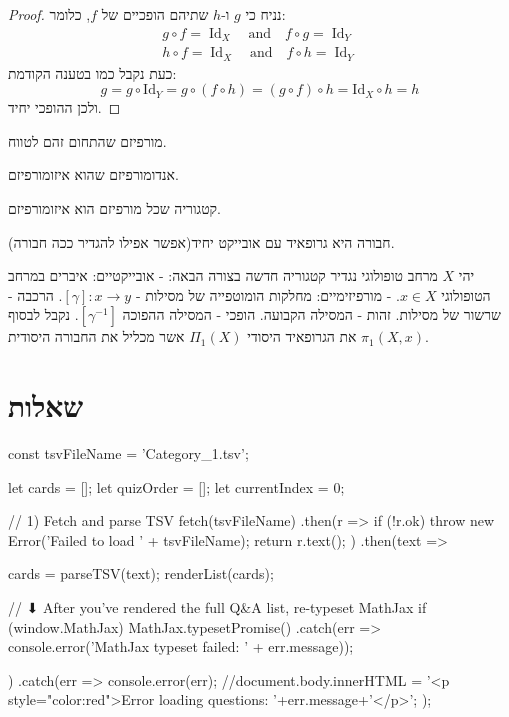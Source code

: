 \documentclass{tstextbook}
\begin{document}
\begin{proof}
נניח כי \(g\) ו-\(h\) שתיהם הופכיים של \(f\), כלומר:
\begin{gather*}g\circ f=\operatorname{Id}_{X}\quad{\mathrm{and}}\quad f\circ g=\operatorname{Id}_{Y} \\h\circ f=\operatorname{Id}_{X}\quad{\mathrm{and}}\quad f\circ h=\operatorname{Id}_{Y}
\end{gather*}
כעת נקבל כמו בטענה הקודמת:
$$g=g\circ{\mathrm{Id}}_{Y}=g\circ(f\circ h)=(g\circ f)\circ h={\mathrm{Id}}_{X}\circ h=h$$
ולכן ההופכי יחיד.

\end{proof}
\begin{definition}[אנדומורפיזם]
מורפיזם שהתחום זהם לטווח.

\end{definition}
\begin{definition}[אוטומורפיזם]
אנדומורפיזם שהוא איזומורפיזם.

\end{definition}
\begin{definition}[גרופויד]
קטגוריה שכל מורפיזם הוא איזומורפיזם.

\end{definition}
\begin{example}
חבורה היא גרופאיד עם אובייקט יחיד(אפשר אפילו להגדיר ככה חבורה).

\end{example}
\begin{example}
יהי \(X\) מרחב טופולוגי נגדיר קטגוריה חדשה בצורה הבאה:
- אובייקטיים: איברים במרחב הטופולוגי \(x \in X\).
- מורפיזימיים: מחלקות הומוטפייה של מסילות - \(\left[ \gamma \right]:x\to y\).
הרכבה - שרשור של מסילות.
זהות - המסילה הקבועה.
הופכי - המסילה ההפוכה \(\left[ \gamma ^{-1} \right]\).
נקבל לבסוף את הגרופאיד היסודי \(\Pi_{1}(X)\) אשר מכליל את החבורה היסודית \(\pi_{1}(X,x)\).

\end{example}
\section{שאלות}


    const tsvFileName = 'Category_1.tsv';

    let cards = [];
    let quizOrder = [];
    let currentIndex = 0;

    // 1) Fetch and parse TSV
fetch(tsvFileName)
  .then(r => {
    if (!r.ok) throw new Error('Failed to load ' + tsvFileName);
    return r.text();
  })
  .then(text => {
    cards = parseTSV(text);
    renderList(cards);

    // ⬇ After you’ve rendered the full Q&A list, re-typeset MathJax
    if (window.MathJax) {
      MathJax.typesetPromise()
        .catch(err => console.error('MathJax typeset failed: ' + err.message));
    }
  })
  .catch(err => {
    console.error(err);
    //document.body.innerHTML =  '<p style="color:red">Error loading questions: '+err.message+'</p>';
  });
\end{document}
